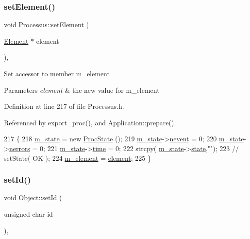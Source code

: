 \subsubsection{\texorpdfstring{set\+Element()}{setElement()}}
{\footnotesize\ttfamily void Processus\+::set\+Element (\begin{DoxyParamCaption}\item[{\hyperlink{classElement}{Element} $\ast$}]{element }\end{DoxyParamCaption})\hspace{0.3cm}{\ttfamily [inline]}, {\ttfamily [inherited]}}

Set accessor to member m\+\_\+element 
\begin{DoxyParams}{Parameters}
{\em element} & the new value for m\+\_\+element \\
\hline
\end{DoxyParams}


Definition at line 217 of file Processus.\+h.



Referenced by export\+\_\+proc(), and Application\+::prepare().


\begin{DoxyCode}
217                                      \{
218     \hyperlink{classProcessus_ab3539eee42891ceae0baf4395ae7fb61}{m\_state} = \textcolor{keyword}{new} \hyperlink{structProcState}{ProcState} ();
219     \hyperlink{classProcessus_ab3539eee42891ceae0baf4395ae7fb61}{m\_state}->\hyperlink{structProcState_a1881d6b0db849a8af15f586ad5959260}{nevent}  = 0;
220     \hyperlink{classProcessus_ab3539eee42891ceae0baf4395ae7fb61}{m\_state}->\hyperlink{structProcState_a51a0f54ba62b07e07ac8518c5f32828d}{nerrors} = 0;
221     \hyperlink{classProcessus_ab3539eee42891ceae0baf4395ae7fb61}{m\_state}->\hyperlink{structProcState_a88c69b099d8f2b2164d478f28e87610f}{time}    = 0;
222     strcpy( \hyperlink{classProcessus_ab3539eee42891ceae0baf4395ae7fb61}{m\_state}->\hyperlink{structProcState_aaffb70e5af437e2c0d4dfc69bd0b24cd}{state},\textcolor{stringliteral}{""});
223     \textcolor{comment}{//  setState( OK );}
224     \hyperlink{classProcessus_aa9d24d53c3e52f36786cabb5d8e296e7}{m\_element} = \hyperlink{classProcessus_a6fe155527431a7190b7d44d600b9608d}{element};
225   \}
\end{DoxyCode}
\mbox{\label{classObject_a398fe08cba594a0ce6891d59fe4f159f}} 
\subsubsection{\texorpdfstring{set\+Id()}{setId()}}
{\footnotesize\ttfamily void Object\+::set\+Id (\begin{DoxyParamCaption}\item[{unsigned char}]{id }\end{DoxyParamCaption})\hspace{0.3cm}{\ttfamily [inline]}, {\ttfamily [inherited]}}



